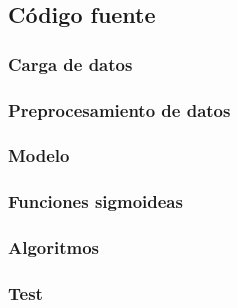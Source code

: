 \subsection{Código fuente}

\subsubsection*{Carga de datos}



\subsubsection*{Preprocesamiento de datos}



\subsubsection*{Modelo}



\subsubsection*{Funciones sigmoideas}



\subsubsection*{Algoritmos}



\subsubsection*{Test}


